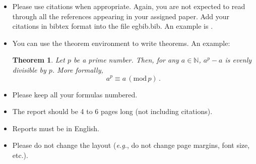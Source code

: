 \documentclass[a4paper,10pt]{article}
\newtheorem{theorem}{Theorem}
\begin{document}
\begin{itemize}
\item Please use citations when appropriate. Again, you are not expected to read through all the references appearing in your assigned paper. Add your citations in bibtex format into the file egbib.bib. An example is \cite{neyshabur2017exploring}.
\item You can use the theorem environment to write theorems. An example:
\begin{theorem}
\label{mytheorem}
Let $p$ be a prime number. Then, for any $a \in \mathbb{N}$, $a^p - a$ is evenly divisible by $p$. More formally,
\begin{equation}
a^p \equiv a \, (\mathrm{mod}\, p)\,.
\end{equation}
\end{theorem}
\item Please keep all your formulas numbered.
\item The report should be 4 to 6 pages long (not including citations).
\item Reports must be in English.
\item Please do not change the layout ({\em e.g.}, do not change page margins, font size, etc.).
\end{itemize}



\end{document}
